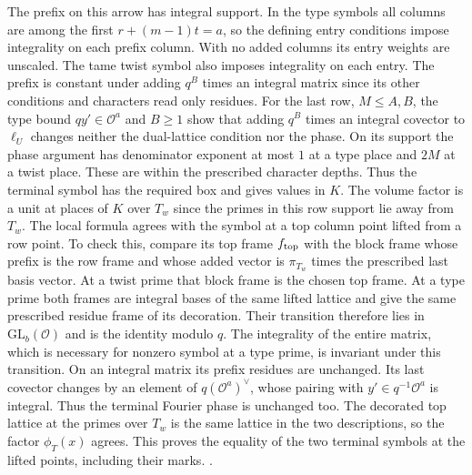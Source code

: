 The prefix on this arrow has integral support. In the type
symbols all columns are among the first \(r+(m-1)t=a\),
so the defining entry conditions impose integrality on each
prefix column. With no added columns its entry weights are
unscaled. The tame twist symbol also imposes integrality
on each entry. The prefix is constant under adding
\(q^B\) times an integral matrix since its other
conditions and characters read only residues. For the last
row, \(M\le A,B\), the type bound \(qy'\in\mathcal O^a\)
and \(B\ge1\) show that adding \(q^B\) times an integral
covector to \(\ell_U\) changes neither the dual-lattice
condition nor the phase. On its support the phase argument
has denominator exponent at most \(1\) at a type place and
\(2M\) at a twist place. These are within the prescribed
character depths. Thus the terminal symbol has the required
box and gives values in \(K\). The volume factor is a unit at
places of \(K\) over \(T_w\) since the primes in this row
support lie away from \(T_w\).
The local formula agrees with the symbol at a top column
point lifted from a row point. To check this, compare its
top frame \(f_{\rm top}\) with the block frame whose prefix
is the row frame and whose added vector is
\(\pi_{T_w}\) times the prescribed last basis vector.
At a twist prime that block frame is the chosen top frame.
At a type prime both frames are integral bases of the
same lifted lattice and give the same prescribed residue
frame of its decoration. Their transition therefore lies
in \(\mathrm{GL}_b(\mathcal O)\) and is the identity
modulo \(q\). The integrality of the entire matrix, which
is necessary for nonzero symbol at a type prime, is invariant
under this transition. On an integral matrix its prefix
residues are unchanged. Its last covector changes by an
element of \(q(\mathcal O^a)^\vee\), whose pairing with
\(y'\in q^{-1}\mathcal O^a\) is integral. Thus the
terminal Fourier phase is unchanged too. The decorated top
lattice at the primes over \(T_w\) is the same lattice in
the two descriptions, so the factor \(\phi_T(x)\) agrees.
This proves the equality of the two terminal symbols
at the lifted points, including their marks.
.


